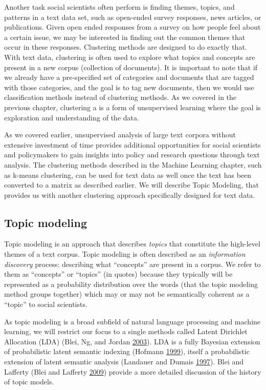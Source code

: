 \documentclass[]{krantz}
\begin{document}
Another task social scientists often perform is finding themes, topics,
and patterns in a text data set, such as open-ended survey responses,
news articles, or publications. Given open ended responses from a survey
on how people feel about a certain issue, we may be interested in
finding out the common themes that occur in these responses. Clustering
methods are designed to do exactly that. With text data, clustering is
often used to explore what topics and concepts are present in a new
corpus (collection of documents). It is important to note that if we
already have a pre-specified set of categories and documents that are
tagged with those categories, and the goal is to tag new documents, then
we would use classification methods instead of clustering methods. As we
covered in the previous chapter, clustering a is a form of unsupervised
learning where the goal is exploration and understanding of the data.

As we covered earlier, unsupervised analysis of large text corpora
without extensive investment of time provides additional opportunities
for social scientists and policymakers to gain insights into policy and
research questions through text analysis. The clustering methods
described in the Machine Learning chapter, such as k-means clustering,
can be used for text data as well once the text has been converted to a
matrix as described earlier. We will describe Topic Modeling, that
provides us with another clustering approach specifically designed for
text data.

\subsection{Topic modeling}\label{sec:lda}

Topic modeling is an approach that describes \emph{topics} that
constitute the high-level themes of a text corpus. Topic modeling is
often described as an \emph{information discovery} process: describing
what ``concepts'' are present in a corpus. We refer to them as
``concepts'' or ``topics'' (in quotes) because they typically will be
represented as a probability distribution over the words (that the topic
modeling method groups together) which may or may not be semantically
coherent as a ``topic'' to social scientists.

As topic modeling is a broad subfield of natural language processing and
machine learning, we will restrict our focus to a single methods called
Latent Dirichlet Allocation (LDA) (Blei, Ng, and Jordan
\protect\hyperlink{ref-blei-03}{2003}). LDA is a fully Bayesian
extension of probabilistic latent semantic indexing (Hofmann
\protect\hyperlink{ref-hofmann-99}{1999}), itself a probabilistic
extension of latent semantic analysis (Landauer and Dumais
\protect\hyperlink{ref-landauer-97}{1997}). Blei and Lafferty (Blei and
Lafferty \protect\hyperlink{ref-blei-09}{2009}) provide a more detailed
discussion of the history of topic models.
\end{document}

